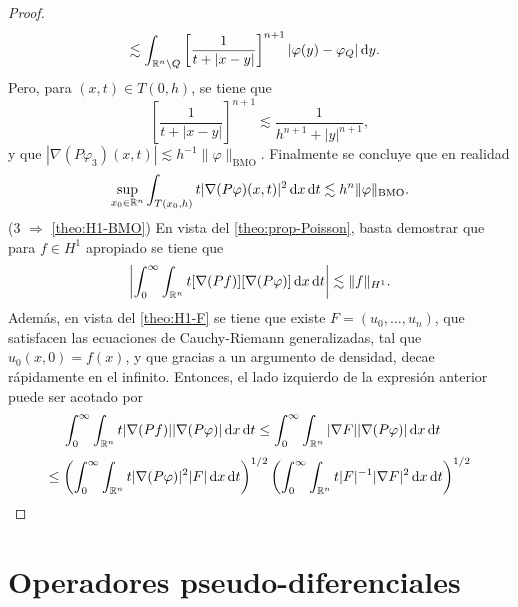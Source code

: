 \begin{proof}
\begin{align*}
		& \lesssim \int_{\mathbb{R}^n\setminus Q} \left[ \frac{1}{t+|x-y|}
		\right]^{n+1} |\varphi(y) - \varphi_Q|\mathop{}\!\mathrm{d} y.
	\end{align*}
	Pero, para $(x, t) \in T(0, h)$, se tiene que
	\begin{equation*}
		\left[ \frac{1}{t+|x-y|}
		\right]^{n+1} \lesssim \frac{1}{h^{n+1} + |y|^{n+1}},
	\end{equation*}
	y que $|\nabla (P\varphi_3)(x, t)| \lesssim h^{-1}\|\varphi\|_{\mathrm{BMO}}$. Finalmente se concluye que en realidad
	\begin{equation*}
		\sup_{x_0\in\mathbb{R}^n}\int_{T(x_0, h)} t|\nabla (P\varphi)(x, t)|^2\mathop{}\!\mathrm{d} x \mathop{}\!\mathrm{d} t \lesssim h^n\|\varphi\|_{\mathrm{BMO}}.
	\end{equation*}
	(3 $\Rightarrow$ \cref{theo:H1-BMO}) En vista del \cref{theo:prop-Poisson}, basta demostrar que para $f\in H^1$ apropiado se tiene que 
	\begin{equation*}
		\left| \int_0^\infty \int_{\mathbb{R}^n} t[\nabla(Pf)][\nabla(P\varphi)]\mathop{}\!\mathrm{d} x \mathop{}\!\mathrm{d} t
		\right| \lesssim \|f\|_{H^1}.
	\end{equation*}
	Además, en vista del \cref{theo:H1-F} se tiene que existe $F=(u_0,\ldots, u_n)$, que satisfacen las ecuaciones de Cauchy-Riemann generalizadas, tal que $u_0(x, 0)=f(x)$, y que gracias a un argumento de densidad, decae rápidamente en el infinito. Entonces, el lado izquierdo de la expresión anterior puede ser acotado por 
	\begin{align*}
		\int_0^\infty \int_{\mathbb{R}^n} t|\nabla(Pf)||\nabla(P\varphi)|\mathop{}\!\mathrm{d} x \mathop{}\!\mathrm{d} t & \leq\int_0^\infty \int_{\mathbb{R}^n}  |\nabla F||\nabla(P\varphi)|\mathop{}\!\mathrm{d} x\mathop{}\!\mathrm{d} t
	\end{align*}
	\begin{equation*}
		\leq \left( \int_0^\infty \int_{\mathbb{R}^n} t|\nabla(P\varphi)|^2|F| \mathop{}\!\mathrm{d} x \mathop{}\!\mathrm{d} t
		\right)^{1/2}\left(\int_0^\infty \int_{\mathbb{R}^n}  t|F|^{-1}|\nabla F|^2 \mathop{}\!\mathrm{d} x \mathop{}\!\mathrm{d} t
		\right)^{1/2}
	\end{equation*}
\end{proof} 
\chapter{Operadores pseudo-diferenciales}

